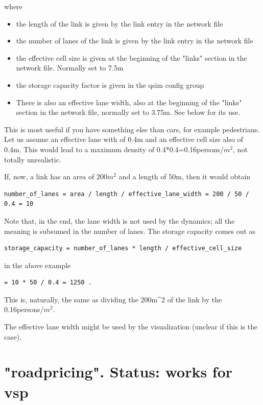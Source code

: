 where
\begin{itemize}
	\item the length of the link is given by the link entry in the network file
	\item the number of lanes of the link is given by the link entry in the network file
	\item the effective cell size is given at the beginning of the "links" section in the network file. Normally set to 7.5m
	\item the storage capacity factor is given in the qsim config group
	\item There  is also an effective lane width, also at the beginning of the "links"  section in the network file, normally set to 3.75m. See below for  its use.
\end{itemize}

This is most useful if you have something else than  cars, for example pedestrians. Let us assume an effective lane  with of 0.4m and an effective cell size also of 0.4m. This would  lead to a maximum density of 0.4*0.4=0.16persons/$m^2$, not totally  unrealistic.

If, now, a link has an area of $200m^2$ and a length of 50m, then it would obtain
\begin{verbatim}
number_of_lanes = area / length / effective_lane_width = 200 / 50 / 0.4 = 10

\end{verbatim}

Note that, in the end, the lane width is not used by the  dynamics; all the meaning is subsumed in the number of lanes. The  storage capacity comes out as
\begin{verbatim}
storage_capacity = number_of_lanes * length / effective_cell_size

\end{verbatim}

in the above example
\begin{verbatim}
= 10 * 50 / 0.4 = 1250 .

\end{verbatim}

This is, naturally, the same as dividing the 200m\textasciicircum2 of the link by the 0.16persons/$m^2$.

The effective lane width might be used by the visualization (unclear if this is the case).

\vfill\eject
\section{"roadpricing".  Status: works for vsp}

